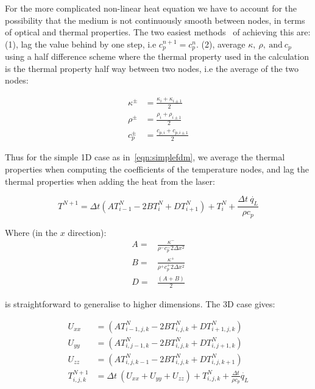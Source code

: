 \medskip

For the more complicated non-linear heat equation we have to account for the possibility that the medium is not continuously smooth between nodes, in terms of optical and thermal properties. The two easiest methods~\cite{ozisik1994finite} of achieving this are: (1), lag the value behind by one step, i.e $c_{p}^{n+1}=c_{p}^{n}$. (2), average $\kappa,\ \rho,\ \text{and}\ c_p$ using a half difference scheme where the thermal property used in the calculation is the thermal property half way between two nodes, i.e the average of the two nodes:

\begin{align}
\kappa^{\pm}&=\frac{\kappa_i+\kappa_{i\pm 1}}{2}\\
\rho^{\pm}&=\frac{\rho_i+\rho_{i\pm 1}}{2}\\
c_p^{\pm}&=\frac{c_{p,i}+c_{p,i\pm 1}}{2}
\end{align}

Thus for the simple 1D case as in~\cref{eqn:simplefdm}, we average the thermal properties when computing the coefficients of the temperature nodes, and lag the thermal properties when adding the heat from the laser:

\begin{equation}
T^{N+1}=\Delta t (AT^N_{i-1}-2BT^N_{i}+DT^N_{i+1})+ T_i^N + \frac{\Delta t\ \dot{q_L}}{\rho c_p}\label{eqn:heatnonlin1d}
\end{equation}

Where (in the $x$ direction):
\begin{align}
A=&\frac{\kappa^{-}}{\rho^{-}c_{p}^{-}2\Delta x^2} \nonumber \\
B=&\frac{\kappa^{+}}{\rho^{+}c_{p}^{+}2\Delta x^2} \label{eqn:coeffsABD}\\
D=&\frac{(A+B)}{2} \nonumber
\end{align}

 is straightforward to generalise to higher dimensions. The 3D case gives:

\begin{align}
U_{xx} &=  (A T^N_{i-1,j,k} - 2B T^N_{i,j,k} + D T^N_{i+1,j,k}) \label{eqn:FDMheat1}\\
U_{yy} &=  (A T^N_{i,j-1,k} - 2B T^N_{i,j,k} + D T^N_{i,j+1,k}) \label{eqn:FDMheat2}\\
U_{zz} &=  (A T^N_{i,j,k-1} - 2B T^N_{i,j,k} + D T^N_{i,j,k+1}) \label{eqn:FDMheat3}\\
T^{N+1}_{i,j,k} &= \Delta t\ (U_{xx} + U_{yy} + U_{zz}) + T^{N}_{i,j,k} + \tfrac{\Delta t}{\rho c_p}\dot{q_L} \label{eqn:FDMheat4}
\end{align}

